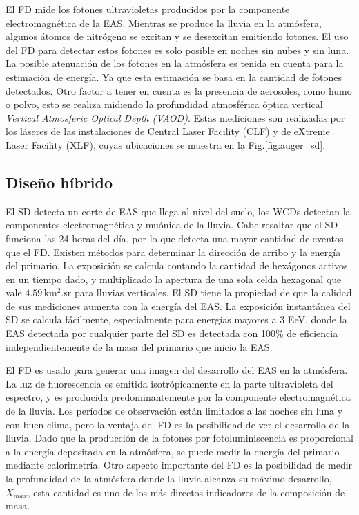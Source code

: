 El FD mide los fotones ultravioletas producidos por la componente electromagnética de la EAS. Mientras se produce la lluvia en la atmósfera, algunos átomos de nitrógeno se excitan y se desexcitan emitiendo fotones. El uso del FD para detectar estos fotones es solo posible en noches sin nubes y sin luna. La posible atenuación de los fotones en la atmósfera es tenida en cuenta para la estimación de energía. Ya que esta estimación se basa en la cantidad de fotones detectados. Otro factor a tener en cuenta es la presencia de aerosoles, como humo o polvo, esto se realiza midiendo la profundidad atmosférica óptica vertical \emph{Vertical Atmosferic Optical Depth (VAOD)}. Estas mediciones son realizadas por los láseres de las instalaciones de Central Laser Facility (CLF) y de eXtreme Laser Facility (XLF), cuyas ubicaciones se muestra en la Fig.\ref{fig:auger_sd}.

\subsection{Diseño híbrido}\label{seccion:sd_eff}

El SD detecta un corte de EAS que llega al nivel del suelo, los WCDs detectan la componentes electromagnética y muónica de la lluvia. Cabe resaltar que el SD funciona las 24 horas del día, por lo que detecta una mayor cantidad de eventos que el FD. Existen métodos para determinar la dirección de arribo y la energía del primario.  La exposición se calcula contando la cantidad de hexágonos activos en un tiempo dado, y multiplicado la apertura de una sola celda hexagonal que vale $4.59\,$km$^2$.sr para lluvias verticales. El SD tiene la propiedad de que la calidad de sus mediciones aumenta con la energía del EAS. La exposición instantánea del SD se calcula fácilmente, especialmente para energías mayores a 3 EeV, donde la EAS detectada por cualquier parte del SD es detectada con 100\% de eficiencia independientemente de la masa del primario que inicio la EAS.

El FD es usado para generar una imagen del desarrollo del EAS en la atmósfera. La luz de fluorescencia es emitida isotrópicamente en la parte ultravioleta del espectro, y es producida predominantemente por la componente electromagnética de la lluvia. Los períodos de observación están limitados a las noches sin luna y con buen clima, pero la ventaja del FD es la posibilidad de ver el desarrollo de la lluvia. Dado que la producción de la fotones por fotoluminiscencia es proporcional a la energía depositada en la atmósfera, se puede medir la energía del primario mediante calorimetría. Otro aspecto importante del FD es la posibilidad de medir la profundidad de la atmósfera donde la lluvia alcanza su máximo desarrollo, $X_{max}$, esta cantidad es uno de los más directos indicadores de la composición de masa. \cite{data}

